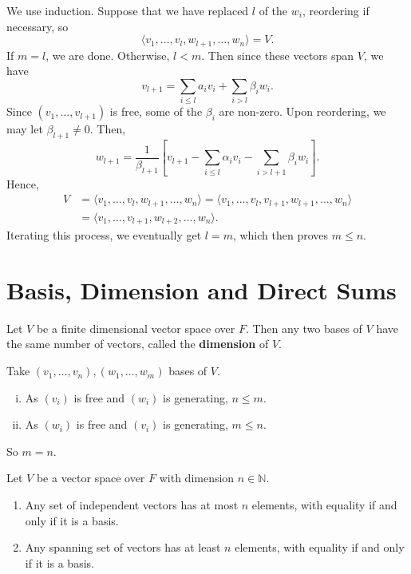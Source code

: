 \documentclass[12pt]{article}
\begin{document}
\begin{proofbox}
	We use induction. Suppose that we have replaced $l$ of the $w_i$, reordering if necessary, so
\[
	\langle v_1, \ldots, v_{l}, w_{l+1}, \ldots, w_n \rangle = V
.\]
If $m = l$, we are done. Otherwise, $l < m$. Then since these vectors span $V$, we have
\[
v_{l+1} = \sum_{i \leq l}a_i v_i + \sum_{i > l}\beta_i w_i
.\]
	Since $(v_1, \ldots, v_{l+1})$ is free, some of the $\beta_i$ are non-zero. Upon reordering, we may let $\beta_{l+1} \neq 0$. Then,
\[
	w_{l+1} = \frac{1}{\beta_{l+1}} \left[ v_{l+1} - \sum_{i \leq l}\alpha_i v_i - \sum_{i > l+1} \beta_i w_i \right]
.\]
Hence, 
\begin{align*}
	V &= \langle v_1, \ldots, v_l, w_{l+1}, \ldots, w_n \rangle = \langle v_1, \ldots, v_l, v_{l+1}, w_{l+1}, \ldots, w_n \rangle \\
	  &= \langle v_1, \ldots, v_{l+1}, w_{l+2}, \ldots, w_n \rangle.
\end{align*}
Iterating this process, we eventually get $l = m$, which then proves $m \leq n$.
\end{proofbox}

\newpage

\section{Basis, Dimension and Direct Sums}%
\label{sec:basis_dimension_and_direct_sums}

\begin{corollary}
	Let $V$ be a finite dimensional vector space over $F$. Then any two bases of $V$ have the same number of vectors, called the \textbf{dimension} of $V$.
\end{corollary}

\begin{proofbox}
	Take $(v_1, \ldots, v_n), (w_1, \ldots, w_m)$ bases of $V$.
	\begin{enumerate}[(i)]
		\item As $(v_i)$ is free and $(w_i)$ is generating, $n \leq m$.
		\item As $(w_i)$ is free and $(v_i)$ is generating, $m \leq n.$
	\end{enumerate}
	So $m = n$.
\end{proofbox}

\begin{corollary}
	Let $V$ be a vector space over $F$ with dimension $n \in \mathbb{N}$.
	\begin{enumerate}[\normalfont(i)]
		\item Any set of independent vectors has at most $n$ elements, with equality if and only if it is a basis.
		\item Any spanning set of vectors has at least $n$ elements, with equality if and only if it is a basis.
	\end{enumerate}
	
\end{corollary}
\end{document}
